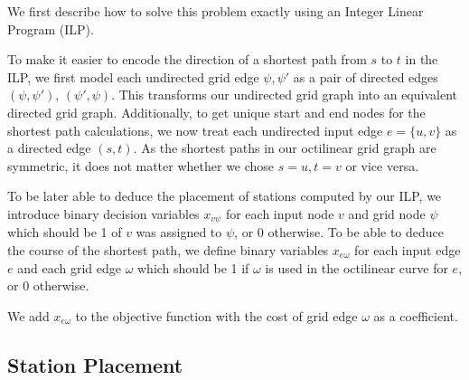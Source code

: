 \documentclass{sig-alternate-sigmod09}
\begin{document}
We first describe how to solve this problem exactly using an Integer Linear Program (ILP).

To make it easier to encode the direction of a shortest path from $s$ to $t$ in the ILP, we first model each undirected grid edge ${\psi, \psi'}$ as a pair of directed edges $(\psi, \psi')$, $(\psi', \psi)$.
This transforms our undirected grid graph into an equivalent directed grid graph.
Additionally, to get unique start and end nodes for the shortest path calculations, we now treat each undirected input edge $e = \{u, v\}$ as a directed edge $(s, t)$.
As the shortest paths in our octilinear grid graph are symmetric, it does not matter whether we chose $s = u, t = v$ or vice versa.

To be later able to deduce the placement of stations computed by our ILP, we introduce binary decision variables $x_{v\psi}$ for each input node $v$ and grid node $\psi$ which should be 1 of $v$ was assigned to $\psi$, or 0 otherwise.
To be able to deduce the course of the shortest path, we define binary variables $x_{e\omega}$ for each input edge $e$ and each grid edge $\omega$ which should be 1 if $\omega$ is used in the octilinear curve for $e$, or 0 otherwise.

We add $x_{e\omega}$ to the objective function with the cost of grid edge $\omega$ as a coefficient.

\subsection{Station Placement}
\end{document}
